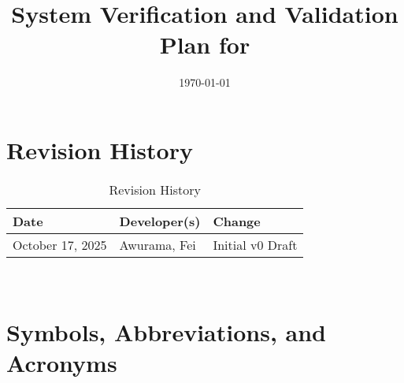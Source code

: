 \documentclass[12pt, titlepage]{article}
\begin{document}
\title{System Verification and Validation Plan for \progname{}} 
\author{\authname}
\date{\today}
	
\maketitle


\section*{Revision History}

\begin{table}[hp]
\caption{Revision History} \label{VnVPlanRevisionHistory}
\begin{tabularx}{\textwidth}{llX}
\toprule
\textbf{Date} & \textbf{Developer(s)} & \textbf{Change}\\
\midrule
October 17, 2025  & Awurama, Fei & Initial v0 Draft\\
\bottomrule
\end{tabularx}
\end{table}

~\\


\newpage

\tableofcontents



\newpage

\section{Symbols, Abbreviations, and Acronyms}
\end{document}

